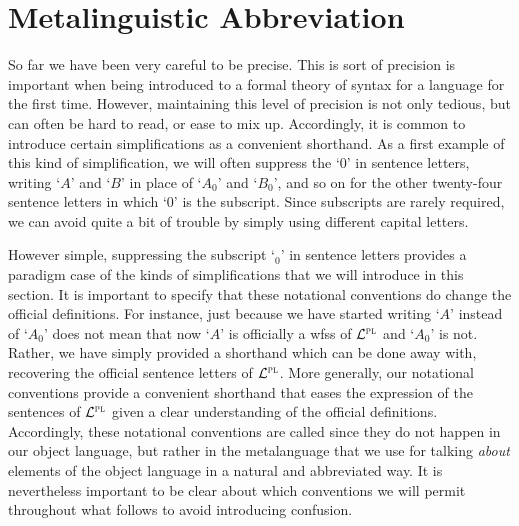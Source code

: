 \section{Metalinguistic Abbreviation}%
  \label{sec:abbreviation}
  
So far we have been very careful to be precise.
This is sort of precision is important when being introduced to a formal theory of syntax for a language for the first time.
However, maintaining this level of precision is not only tedious, but can often be hard to read, or ease to mix up.
Accordingly, it is common to introduce certain simplifications as a convenient shorthand.
As a first example of this kind of simplification, we will often suppress the `$0$' in sentence letters, writing `$A$' and `$B$' in place of `$A_0$' and `$B_0$', and so on for the other twenty-four sentence letters in which `$0$' is the subscript.
Since subscripts are rarely required, we can avoid quite a bit of trouble by simply using different capital letters. %

However simple, suppressing the subscript `$_0$' in sentence letters provides a paradigm case of the kinds of simplifications that we will introduce in this section.
It is important to specify that these notational conventions do change the official definitions.
For instance, just because we have started writing `$A$' instead of `$A_0$' does not mean that now `$A$' is officially a wfss of $\mathcal{L}^{\textsc{pl}}$ and `$A_0$' is not.
Rather, we have simply provided a shorthand which can be done away with, recovering the official sentence letters of $\mathcal{L}^{\textsc{pl}}$.
More generally, our notational conventions provide a convenient shorthand that eases the expression of the sentences of $\mathcal{L}^{\textsc{pl}}$ given a clear understanding of the official definitions.
Accordingly, these notational conventions are called  since they do not happen in our object language, but rather in the metalanguage that we use for talking \textit{about} elements of the object language in a natural and abbreviated way.
It is nevertheless important to be clear about which conventions we will permit throughout what follows to avoid introducing confusion.

